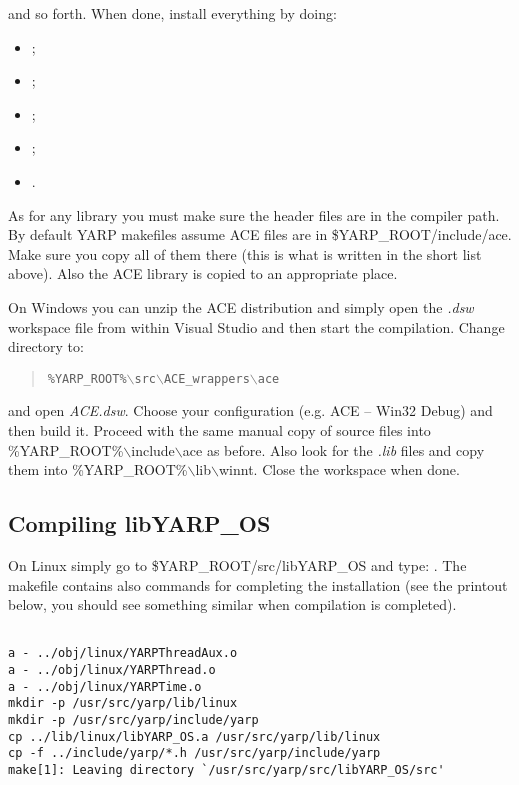 and so forth. When done, install everything by doing:

\begin{itemize}
\item {};
\item {};
\item {};
\item {};
\item {}.
\end{itemize}

As for any library you must make sure the header files are in the compiler path. By default YARP makefiles assume ACE files are in \$YARP\_ROOT/include/ace. Make sure you copy all of them there (this is what is written in the short list above). Also the ACE library is copied to an appropriate place. 

On Windows you can unzip the ACE distribution and simply open the {\em .dsw} workspace file from within Visual Studio and then start the compilation. Change directory to:

\begin{quote}
{\tt \%YARP\_ROOT\%$\backslash$src$\backslash$ACE\_wrappers$\backslash$ace}
\end{quote}
 
\noindent and open {\em ACE.dsw}. Choose your configuration (e.g. ACE -- Win32 Debug) and then build it. Proceed with the same manual copy of source files into \%YARP\_ROOT\%$\backslash$include$\backslash$ace as before. Also look for the {\em *.lib} files and copy them into \%YARP\_ROOT\%$\backslash$lib$\backslash$winnt. Close the workspace when done.


\subsection{Compiling libYARP\_OS}

On Linux simply go to \$YARP\_ROOT/src/libYARP\_OS and type: . The makefile contains also commands for completing the installation (see the printout below, you should see something similar when compilation is completed). 

\begin{verbatim}

a - ../obj/linux/YARPThreadAux.o
a - ../obj/linux/YARPThread.o
a - ../obj/linux/YARPTime.o
mkdir -p /usr/src/yarp/lib/linux
mkdir -p /usr/src/yarp/include/yarp
cp ../lib/linux/libYARP_OS.a /usr/src/yarp/lib/linux
cp -f ../include/yarp/*.h /usr/src/yarp/include/yarp
make[1]: Leaving directory `/usr/src/yarp/src/libYARP_OS/src'

\end{verbatim}

